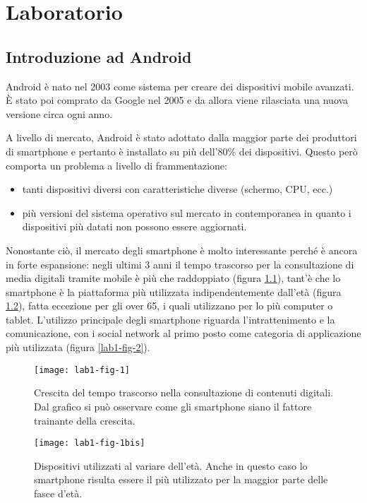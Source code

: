 \part{Laboratorio}

\chapter{Introduzione ad Android}

Android è nato nel 2003 come sistema per creare dei dispositivi mobile
avanzati.
\`E stato poi comprato da Google nel 2005 e da allora viene rilasciata
una nuova versione circa ogni anno.

A livello di mercato, Android è stato adottato dalla maggior parte dei
produttori di smartphone e pertanto è installato su più dell'80\% dei
dispositivi.
Questo però comporta un problema a livello di frammentazione:

\begin{itemize}
	\item tanti dispositivi diversi con caratteristiche diverse (schermo, CPU, ecc.)
	\item più versioni del sistema operativo sul mercato in contemporanea in quanto i dispositivi più datati non possono essere aggiornati.
\end{itemize}

Nonostante ciò, il mercato degli smartphone è molto interessante perché è ancora in forte espansione: negli ultimi 3 anni il tempo trascorso per la consultazione di media digitali tramite mobile è più che raddoppiato (figura \ref{lab1-fig-1}), tant'è che lo smartphone è la piattaforma più utilizzata indipendentemente dall'età (figura \ref{lab1-fig-1bis}), fatta eccezione per gli over 65, i quali utilizzano per lo più computer o tablet.
L'utilizzo principale degli smartphone riguarda l'intrattenimento e la comunicazione, con i social network al primo posto come categoria di applicazione più utilizzata (figura \ref{lab1-fig-2}).


\begin{figure}[htbp]
	\centering
	\texttt{[image: lab1-fig-1]}
	\caption[Crescita del tempo trascorso nella consultazione di contenuti digitali]{Crescita del tempo trascorso nella consultazione di contenuti digitali. Dal grafico si può osservare come gli smartphone siano il fattore trainante della crescita.}\label{lab1-fig-1}
\end{figure}

\begin{figure}[htbp]
	\centering
	\texttt{[image: lab1-fig-1bis]}
	\caption[Dispositivi utilizzati al variare dell'età]{Dispositivi utilizzati al variare dell'età. Anche in questo caso lo smartphone risulta essere il più utilizzato per la maggior parte delle fasce d'età.}\label{lab1-fig-1bis}
\end{figure}

